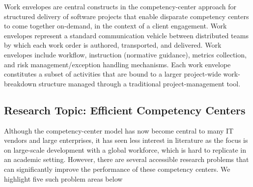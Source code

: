 Work envelopes are central constructs in the competency-center approach for
structured delivery of software projects that enable disparate competency
centers to come together on-demand, in the context of a client engagement.  Work
envelopes represent a standard communication vehicle between distributed teams
by which each work order is authored, transported, and delivered. Work envelopes
include workflow, instruction (normative guidance), metrics collection, and risk
management/exception handling mechanisms. Each work envelope constitutes a
subset of activities that are bound to a larger project-wide work-breakdown
structure managed through a traditional project-management tool.

\subsection{Research Topic: Efficient Competency Centers}

Although the competency-center model has now become central to many IT vendors
and large enterprises, it has seen less interest in literature as the focus is
on large-scale development with a global workforce, which is hard to replicate
in an academic setting. However, there are several accessible research problems
that can significantly improve the performance of these competency centers. We
highlight five such problem areas below

